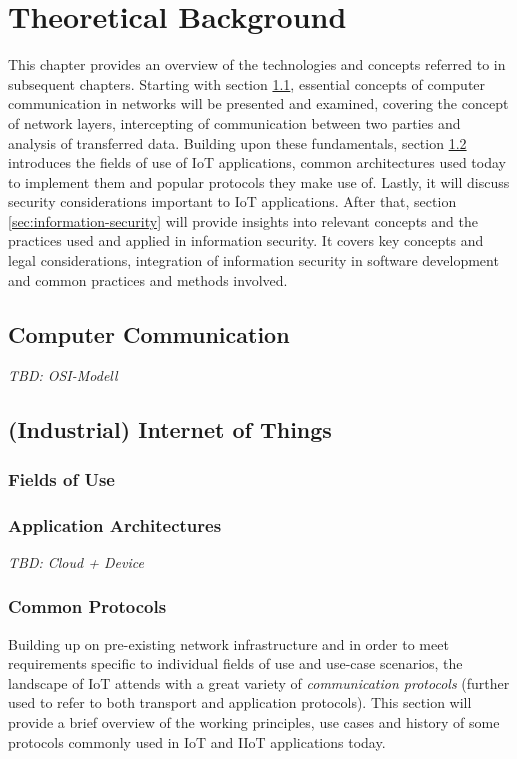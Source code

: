 \chapter{Theoretical Background}
\label{chap:theoretical-background}
This chapter provides an overview of the technologies and concepts referred to in subsequent chapters.
Starting with section \ref{sec:computer-networks}, essential concepts of computer communication in networks will be presented and examined, covering the concept of network layers, intercepting of communication between two parties and analysis of transferred data.
Building upon these fundamentals, section \ref{sec:internet-of-things} introduces the fields of use of \ac{IoT} applications, common architectures used today to implement them and popular protocols they make use of. Lastly, it will discuss security considerations important to \ac{IoT} applications.
After that, section \ref{sec:information-security} will provide insights into relevant concepts and the practices used and applied in information security. It covers key concepts and legal considerations, integration of information security in software development and common practices and methods involved.

\section{Computer Communication}
\label{sec:computer-networks}
\emph{TBD: OSI-Modell} %

\section{(Industrial) Internet of Things}
\label{sec:internet-of-things}
\subsection{Fields of Use}
\subsection{Application Architectures}
\emph{TBD: Cloud + Device}
\subsection{Common Protocols}
\label{sec:iot-common-protocols}
Building up on pre-existing network infrastructure and in order to meet requirements specific to individual fields of use and use-case scenarios, the landscape of \ac{IoT} attends with a great variety of \emph{communication protocols} (further used to refer to both transport and application protocols). This section will provide a brief overview of the working principles, use cases and history of some protocols commonly used in \ac{IoT} and \ac{IIoT} applications today.
